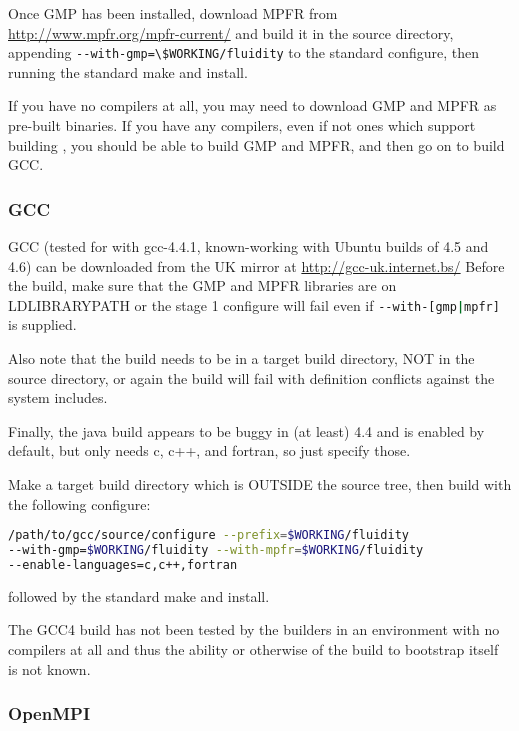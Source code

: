 Once GMP has been installed, download MPFR from
\url{http://www.mpfr.org/mpfr-current/} and build it in the source directory,
appending \lstinline[language=bash]+--with-gmp=\$WORKING/fluidity+ to the
standard configure, then running the standard make and install.

If you have no compilers at all, you may need to download GMP and MPFR as
pre-built binaries. If you have any compilers, even if not ones which support
building \fluidity, you should be able to build GMP and MPFR, and then go on to
build GCC.

\subsubsection{GCC}
\label{sec:required_libraries_compilers_gcc}

GCC (tested for \fluidity with gcc-4.4.1, known-working with Ubuntu builds of
4.5 and 4.6) can be downloaded from the UK mirror at
\url{http://gcc-uk.internet.bs/} Before the build, make sure that the GMP and
MPFR libraries are on LD{\textunderscore}LIBRARY{\textunderscore}PATH or the
stage 1 configure will fail even if
\lstinline[language=bash]+--with-[gmp|mpfr]+ is supplied.

Also note that the build needs to be in a target build directory, NOT in the
source directory, or again the build will fail with definition conflicts
against the system includes.

Finally, the java build appears to be buggy in (at least) 4.4 and is enabled by
default, but \fluidity only needs c, c++, and fortran, so just specify those.

Make a target build directory which is OUTSIDE the source tree, then build
with the following configure:

\begin{lstlisting}[language=bash]
/path/to/gcc/source/configure --prefix=$WORKING/fluidity 
--with-gmp=$WORKING/fluidity --with-mpfr=$WORKING/fluidity 
--enable-languages=c,c++,fortran
\end{lstlisting}

followed by the standard make and install.

The GCC4 build has not been tested by the \fluidity builders in an environment
with no compilers at all and thus the ability or otherwise of the build to
bootstrap itself is not known.

\subsubsection{OpenMPI}
\label{sec:required_libraries_compilers_openmpi}

